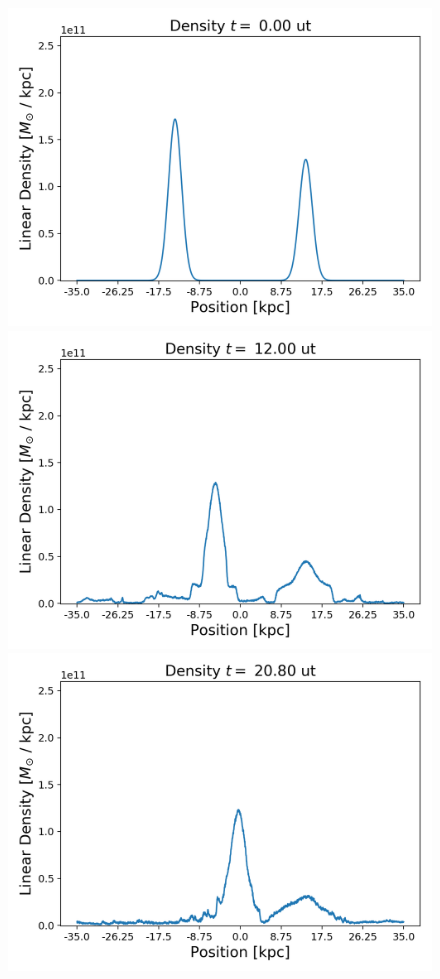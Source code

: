{\begin{figure}[h!]
    \centering
    \includegraphics[scale=0.45]{imag/cBulletD0.png}
    \includegraphics[scale=0.45]{imag/cBulletD30.png}
    \includegraphics[scale=0.45]{imag/cBulletD52.png}

\end{figure}}

